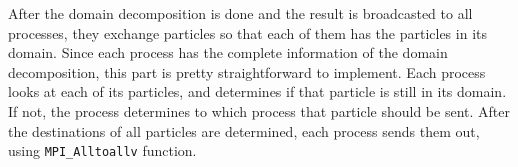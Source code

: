 After the domain decomposition is done and the result is broadcasted
to all processes, they exchange particles so that each of them has the
particles in its domain. Since each process has the complete
information of the domain decomposition, this part is pretty
straightforward to implement. Each process looks at each of its
particles, and determines if that particle is still in its domain.  If
not, the process determines to which process that particle should be
sent. After the destinations of all particles are determined, each
process sends them out, using \texttt{MPI\_Alltoallv} function.

